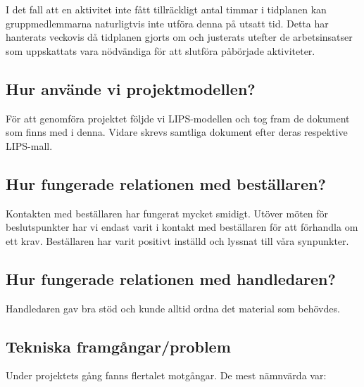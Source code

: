 \documentclass[a4paper,12pt]{article}
\begin{document}
I det fall att en aktivitet inte fått tillräckligt antal timmar i tidplanen kan gruppmedlemmarna naturligtvis inte utföra denna på utsatt tid. Detta har hanterats veckovis då tidplanen gjorts om och justerats utefter de arbetsinsatser som uppskattats vara nödvändiga för att slutföra påbörjade aktiviteter.

\subsection{Hur använde vi projektmodellen?}
För att genomföra projektet följde vi LIPS-modellen och tog fram de dokument som finns med i denna. Vidare skrevs samtliga dokument efter deras respektive LIPS-mall. 

\subsection{Hur fungerade relationen med beställaren?}
Kontakten med beställaren har fungerat mycket smidigt. Utöver möten för beslutspunkter har vi endast varit i kontakt med beställaren för att förhandla om ett krav. Beställaren har varit positivt inställd och lyssnat till våra synpunkter.

\subsection{Hur fungerade relationen med handledaren?}
Handledaren gav bra stöd och kunde alltid ordna det material som behövdes.

\subsection{Tekniska framgångar/problem}
Under projektets gång fanns flertalet motgångar. De mest nämnvärda var:
\end{document}
